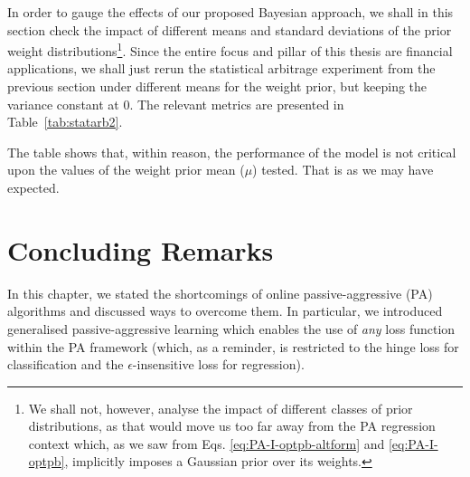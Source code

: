 In order to gauge the effects of our proposed Bayesian approach, we shall in this section check the impact of different means and standard deviations of the prior weight distributions\footnote{We shall not, however, analyse the impact of different classes of prior distributions, as that would move us too far away from the PA regression context which, as we saw from Eqs. \eqref{eq:PA-I-optpb-altform} and \eqref{eq:PA-I-optpb}, implicitly imposes a Gaussian prior over its weights.}. Since the entire focus and pillar of this thesis are financial applications, we shall just rerun the statistical arbitrage experiment from the previous section under different means for the weight prior, but keeping the variance constant at 0. The relevant metrics are presented in Table~\ref{tab:statarb2}.
\begin{table}[H]
\caption{Performance of the GDX-GLD pairs trade under ADA-BYPASS, with different prior means $\mu$ (picked arbitrarily) and constant, zero variance.}
\label{tab:statarb2}
\centering
{}
\end{table}
The table shows that, within reason, the performance of the model is not critical upon the values of the weight prior mean ($\mu$) tested. That is as we may have expected.



\section{Concluding Remarks}

In this chapter, we stated the shortcomings of online passive-aggressive (PA) algorithms and discussed ways to overcome them. In particular, we introduced generalised passive-aggressive learning which enables the use of \emph{any} loss function within the PA framework (which, as a reminder, is restricted to the hinge loss for classification and the $\epsilon$-insensitive loss for regression).

